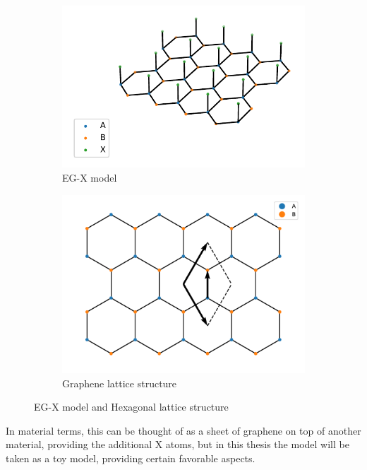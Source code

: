 \documentclass[../main.tex]{subfiles}
\begin{document}
\begin{figure}[t]
	\begin{subfigure}{0.5\linewidth}
		\centering
		\includegraphics[width=\linewidth]{images/eg-x lattice cropped}
		\caption{EG-X model}
		\label{fig:eg-x model}
	\end{subfigure}
	\begin{subfigure}{0.5\linewidth}
		\centering
		\includegraphics[width=\linewidth]{images/graphene lattice}
		\caption{Graphene lattice structure}
		\label{fig:graphene lattice structure}
	\end{subfigure}
	\caption{EG-X model and Hexagonal lattice structure}
	\label{fig:structures eg-x model and hexagonal lattice structure}
\end{figure}
In material terms, this can be thought of as a sheet of graphene on top of another material, providing the additional \(\mathrm{X}\) atoms, but in this thesis the model will be taken as a toy model, providing certain favorable aspects.
\end{document}
